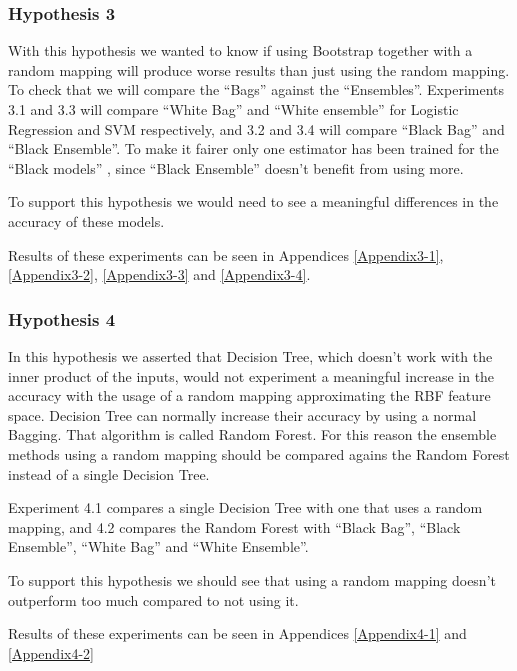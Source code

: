   \begin{pre-delivery}
  \subsubsection*{Hypothesis 3}

  With this hypothesis we wanted to know if using Bootstrap together with a
  random mapping will produce worse results than just using the random
  mapping. To check that we will compare the ``Bags'' against the ``Ensembles''.
  Experiments 3.1 and 3.3 will compare ``White Bag'' and ``White ensemble'' for
  Logistic Regression and SVM respectively, and 3.2 and 3.4 will compare
  ``Black Bag'' and ``Black Ensemble''. To make it fairer only one estimator
  has been trained for the ``Black models'' , since ``Black Ensemble''
  doesn't benefit from using more.

  To support
  this hypothesis we would need to see a meaningful
  differences in the accuracy of these models.

  Results of these experiments can be seen in Appendices
  \ref{Appendix3-1},
  \ref{Appendix3-2},
  \ref{Appendix3-3} and
  \ref{Appendix3-4}.



  \subsubsection*{Hypothesis 4}

  In this hypothesis we asserted that Decision Tree, which doesn't work with
  the inner product of the inputs, would not experiment a meaningful increase
  in the accuracy with the usage of a random mapping approximating the
  RBF feature space. Decision Tree can normally increase their accuracy
  by using a normal Bagging. That algorithm is called Random Forest. For this
  reason the ensemble methods using a random mapping should be compared agains
  the Random Forest instead of a single Decision Tree.

  Experiment 4.1 compares a single Decision Tree with one that uses a
  random mapping, and 4.2 compares the Random Forest with
  ``Black Bag'',
  ``Black Ensemble'',
  ``White Bag'' and
  ``White Ensemble''.

  To support this hypothesis we should see that using a random mapping doesn't
  outperform too much compared to not using it.

  Results of these experiments can be seen in Appendices \ref{Appendix4-1}
  and \ref{Appendix4-2}
\end{pre-delivery}

